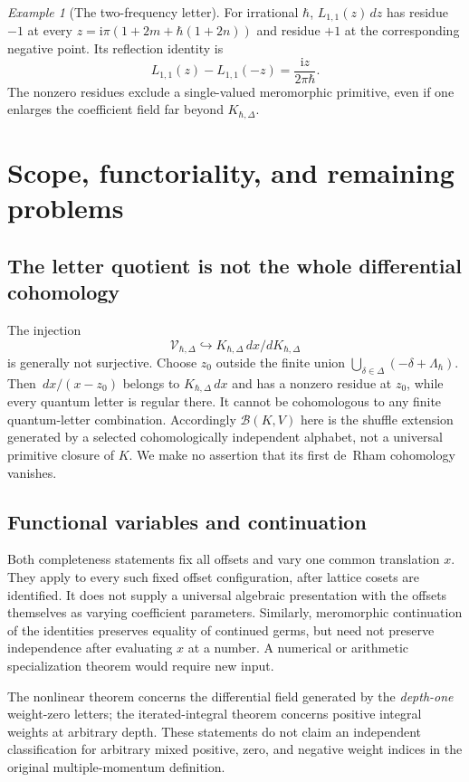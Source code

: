 \documentclass[11pt]{article}
\numberwithin{equation}{section}
\theoremstyle{definition}
\theoremstyle{remark}
\newtheorem{example}[example]{Example}
\newcommand{\dd}{\,d}
\newcommand{\ii}{\mathrm i}
\newcommand{\calV}{\mathcal V}
\newcommand{\calB}{\mathcal B}
\newcommand{\qh}{\hbar}
\begin{document}
\begin{example}[The two-frequency letter]
For irrational $\qh$, $L_{1,1}(z)\dd z$ has residue $-1$ at every
$z=\ii\pi(1+2m+\qh(1+2n))$ and residue $+1$ at the corresponding negative
point. Its reflection identity is
\[
 L_{1,1}(z)-L_{1,1}(-z)=\frac{\ii z}{2\pi\qh}.
\]
The nonzero residues exclude a single-valued meromorphic primitive, even if
one enlarges the coefficient field far beyond $K_{\qh,\Delta}$.
\end{example}

\section{Scope, functoriality, and remaining problems}\label{sec:limits}

\subsection{The letter quotient is not the whole differential cohomology}

The injection
\[
 \calV_{\qh,\Delta}\hookrightarrow K_{\qh,\Delta}\dd x/dK_{\qh,\Delta}
\]
is generally not surjective. Choose $z_0$ outside the finite union
$\bigcup_{\delta\in\Delta}(-\delta+\Lambda_{\qh})$.
Then $\dd x/(x-z_0)$ belongs to $K_{\qh,\Delta}\dd x$ and has a nonzero
residue at $z_0$, while every quantum letter is regular there. It cannot be
cohomologous to any finite quantum-letter combination. Accordingly
$\calB(K,V)$ here is the shuffle extension generated by a selected
cohomologically independent alphabet, not a universal primitive closure of
$K$. We make no assertion that its first de~Rham cohomology vanishes.

\subsection{Functional variables and continuation}

Both completeness statements fix all offsets and vary one common translation
$x$. They apply to every such fixed offset configuration, after lattice
cosets are identified. It does not supply a universal algebraic presentation
with the offsets themselves as varying coefficient parameters. Similarly,
meromorphic continuation of the identities preserves equality of continued
germs, but need not preserve independence after evaluating $x$ at a number.
A numerical or arithmetic specialization theorem would require new input.

The nonlinear theorem concerns the differential field generated by the
\emph{depth-one} weight-zero letters; the iterated-integral theorem concerns
positive integral weights at arbitrary depth. These statements do not claim
an independent classification for arbitrary mixed positive, zero, and
negative weight indices in the original multiple-momentum definition.
\end{document}

